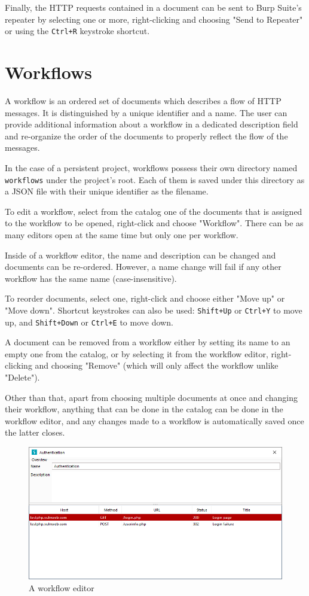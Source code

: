 \documentclass{article}
\begin{document}
Finally, the HTTP requests contained in a document can be sent to Burp Suite's repeater by selecting one or more, right-clicking and choosing "Send to Repeater" or using the \verb|Ctrl+R| keystroke shortcut.

\section{Workflows} \label{workflows}

A workflow is an ordered set of documents which describes a flow of HTTP messages. It is distinguished by a unique identifier and a name. The user can provide additional information about a workflow in a dedicated description field and re-organize the order of the documents to properly reflect the flow of the messages.

In the case of a persistent project, workflows possess their own directory named \verb|workflows| under the project's root. Each of them is saved under this directory as a JSON file with their unique identifier as the filename.

To edit a workflow, select from the catalog one of the documents that is assigned to the workflow to be opened, right-click and choose "Workflow". There can be as many editors open at the same time but only one per workflow. 

Inside of a workflow editor, the name and description can be changed and documents can be re-ordered. However, a name change will fail if any other workflow has the same name (case-insensitive).

To reorder documents, select one, right-click and choose either "Move up" or "Move down". Shortcut keystrokes can also be used: \verb|Shift+Up| or \verb|Ctrl+Y| to move up, and \verb|Shift+Down| or \verb|Ctrl+E| to move down.

A document can be removed from a workflow either by setting its name to an empty one from the catalog, or by selecting it from the workflow editor, right-clicking and choosing "Remove" (which will only affect the workflow unlike "Delete").

Other than that, apart from choosing multiple documents at once and changing their workflow, anything that can be done in the catalog can be done in the workflow editor, and any changes made to a workflow is automatically saved once the latter closes.

\begin{figure}[h]
    \centering
    \includegraphics[width=\linewidth]{assets/workflow_editor.png}
    \caption{A workflow editor}
    \label{fig:workflow editor}
\end{figure}
\end{document}
